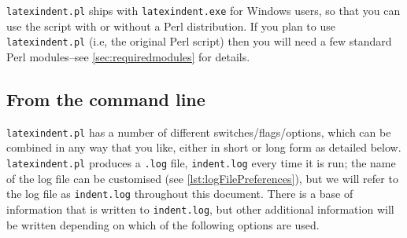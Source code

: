 \documentclass[11pt]{article}
\begin{document}
\lstinline!latexindent.pl! ships with \lstinline!latexindent.exe! for Windows
users, so that you can use the script with or without a Perl distribution.
If you plan to use \lstinline!latexindent.pl! (i.e, the original Perl script) then you will
need a few standard Perl modules--see \vref{sec:requiredmodules} for details.

\subsection{From the command line}\label{sec:commandline}
\lstinline!latexindent.pl! has a number of different switches/flags/options, which
can be combined in any way that you like, either in short or long form as detailed below. 
\lstinline!latexindent.pl!  produces a \lstinline!.log! file, \lstinline!indent.log! every time it
is run; the name of the log file can be customised (see \vref{lst:logFilePreferences}), but we will 
refer to the log file as \lstinline!indent.log! throughout this document. 
There is a base of information that is written to \lstinline!indent.log!,
but other additional information will be written depending
on which of the following options are used.
\end{document}
